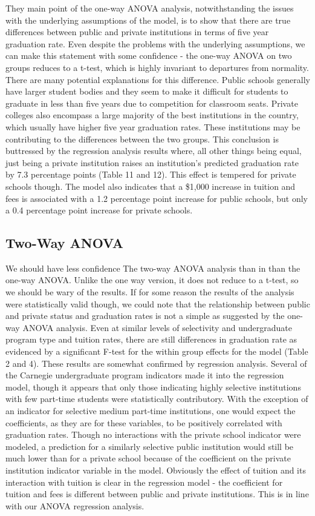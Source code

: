 \documentclass{article}
\begin{document}
They main point of the one-way ANOVA analysis, notwithstanding the issues with the underlying assumptions of the model, is to show that there are true differences between public and private institutions in terms of five year graduation rate. Even despite the problems with the underlying assumptions, we can make this statement with some confidence - the one-way ANOVA on two groups reduces to a t-test, which is highly invariant to departures from normality. There are many potential explanations for this difference. Public schools generally have larger student bodies and they seem to make it difficult for students to graduate in less than five years due to competition for classroom seats. Private colleges also encompass a large majority of the best institutions in the country, which usually have higher five year graduation rates. These institutions may be contributing to the differences between the two groups. This conclusion is buttressed by the regression analysis results where, all other things being equal, just being a private institution raises an institution's predicted graduation rate by 7.3 percentage points (Table 11 and 12). This effect is tempered for private schools though. The model also indicates that a \$1,000 increase in tuition and fees is associated with a 1.2 percentage point increase for public schools, but only a 0.4 percentage point increase for private schools.

\subsection{Two-Way ANOVA}

We should have less confidence The two-way ANOVA analysis than in than the one-way ANOVA. Unlike the one way version, it does not reduce to a t-test, so we should be wary of the results. If for some reason the results of the analysis were statistically valid though, we could note that the relationship between public and private status and graduation rates is not a simple as suggested by the one-way ANOVA analysis. Even at similar levels of selectivity and undergraduate program type and tuition rates, there are still differences in graduation rate as evidenced by a significant F-test for the within group effects for the model (Table 2 and 4). These results are somewhat confirmed by regression analysis. Several of the Carnegie undergraduate program indicators made it into the regression model, though it appears that only those indicating highly selective institutions with few part-time students were statistically contributory. With the exception of an indicator for selective medium part-time institutions, one would expect the coefficients, as they are for these variables, to be positively correlated with graduation rates. Though no interactions with the private school indicator were modeled, a prediction for a similarly selective public institution would still be much lower than for a private school because of the coefficient on the private institution indicator variable in the model. Obviously the effect of tuition and its interaction with tuition is clear in the regression model - the coefficient for tuition and fees is different between public and private institutions. This is in line with our ANOVA regression analysis.
\end{document}

